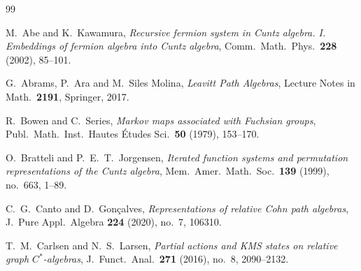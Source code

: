 \documentclass[12pt, reqno]{amsart}
\theoremstyle{definition}
\theoremstyle{remark}
\numberwithin{equation}{section}
\begin{document}


\begin{thebibliography}{99}

M.\ Abe and K.\ Kawamura,
\textit{Recursive fermion system in Cuntz algebra. I. Embeddings of fermion algebra into Cuntz algebra},
Comm.\ Math.\ Phys.\ \textbf{228} (2002), 85--101.

G.\ Abrams, P.\ Ara and M.\ Siles Molina,
\textit{Leavitt Path Algebras},
Lecture Notes in Math.\ \textbf{2191}, Springer, 2017.



R.\ Bowen and C.\ Series,
\textit{Markov maps associated with Fuchsian groups},
Publ.\ Math.\ Inst.\ Hautes \'Etudes Sci.\ \textbf{50} (1979), 153--170.

O.\ Bratteli and P.\ E.\ T.\ Jorgensen,
\textit{Iterated function systems and permutation representations of the Cuntz algebra},
Mem.\ Amer.\ Math.\ Soc.\ \textbf{139} (1999), no.\ 663, 1--89.

C.\ G.\ Canto and D.\ Gon\c{c}alves,
\textit{Representations of relative Cohn path algebras},
J.\ Pure Appl.\ Algebra \textbf{224} (2020), no.\ 7, 106310.

T.\ M.\ Carlsen and N.\ S.\ Larsen,
\textit{Partial actions and KMS states on relative graph $C^*$-algebras},
J.\ Funct.\ Anal.\ \textbf{271} (2016), no.\ 8, 2090--2132.


\end{thebibliography}
\end{document}
